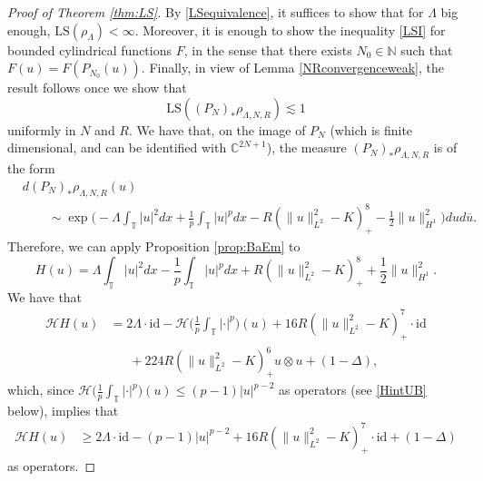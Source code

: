 \documentclass[letterpaper, 11pt,  reqno]{amsart}
\theoremstyle{definition}
\newcommand{\1}{\mathbbm 1}
\newcommand{\noi}{\noindent}
\newcommand{\C}{\mathbb{C}}
\newcommand{\T}{\mathbb{T}}
\renewcommand{\H}{\mathcal H}
\newcommand{\0}{\mathbf 0}
\newcommand{\Ld}{\Lambda}
\newcommand{\cj}{\overline}
\newcommand{\les}{\lesssim}
\newcommand{\N}{\mathbb{N}}
\renewcommand{\H}{\mathcal{H}}
\newcommand{\gp}[1]{\marginpar{\color{red} $\Leftarrow\Leftarrow\Leftarrow$}{\smallskip \noi\color{teal}GP: #1}\smallskip}
\numberwithin{equation}{section}
\numberwithin{theorem}{section}
\newcommand{\id}{\mathrm{id}}
\begin{document}
 
\begin{proof}[Proof of Theorem \ref{thm:LS}]
    By \eqref{LSequivalence}, 
    it suffices to show that for $\Ld$ big enough, $\mathrm{LS}(\rho_\Ld) <\infty$. Moreover, it is enough to show the inequality \eqref{LSI} for bounded cylindrical functions $F$, in the sense that there exists $N_0 \in \N$ such that $F(u) = F(P_{N_0} (u))$. Finally, in view of Lemma \ref{NRconvergenceweak}, the result follows once we show that 
    $$ \mathrm{LS}((P_N)_* \rho_{\Ld,N,R}) \les 1 $$
    uniformly in $N$ and $R$. We have that, on the image of $P_N$ (which is finite dimensional, and can be identified with $\C^{2N+1}$), the measure $(P_N)_* \rho_{\Ld,N,R}$ is of the form 
    \begin{align*}
    & d(P_N)_* \rho_{\Ld,N,R}(u)
    \\
    & \qquad \sim
    \exp\Big(- \Ld \int_\T |u|^2 dx + \frac 1p \int_\T |u|^p dx - R(\|u\|_{L^2}^2 - K)_+^8 - \frac12 \| u \|_{H^1}^2 \Big) du d\cj u.
    \end{align*}
    Therefore, we can apply Proposition \ref{prop:BaEm} to 
    $$ H(u) = \Ld \int_\T |u|^2 dx - \frac 1p \int_\T |u|^p dx +  R(\|u\|_{L^2}^2 - K)_+^8 + \frac12 \| u \|_{H^1}^2. $$
    We have that 
    \begin{equation}
    \begin{aligned}
        \H H(u) &= 2 \Ld \cdot \id - \mathcal H\big(\tfrac1p{\textstyle\int_\T}|\cdot|^p\big)(u) + 
        16R (\|u\|_{L^2}^2 - K)_+^7 \cdot \id \\
        &\phantom{=\ }+ 224R   (\|u\|_{L^2}^2 - K)_+^6 u \otimes u 
        + (1-\Delta),
    \end{aligned}
    \label{HessH}
    \end{equation}
which, since $\mathcal H\big(\tfrac1p{\textstyle\int_\T}|\cdot|^p\big)(u)\le(p-1)|u|^{p-2}$ as operators (see \eqref{HintUB} below), implies that 
\begin{equation*}
\begin{aligned}
  \mathcal{H} H(u) 
  &\ge 2\Lambda \cdot \mathrm{id}
   - (p-1)|u|^{p-2}
   + 16R(\|u\|_{L^2}^2-K)_+^7 \cdot \mathrm{id}
   + (1-\Delta)
\end{aligned}
\end{equation*}
as operators.
 

\end{proof}
\end{document}
